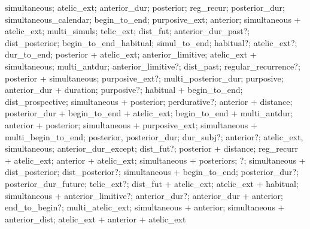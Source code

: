 simultaneous; atelic\_ext; anterior\_dur; posterior; reg\_recur; posterior\_dur; simultaneous\_calendar; begin\_to\_end; purposive\_ext; anterior; simultaneous + atelic\_ext; multi\_simuls; telic\_ext; dist\_fut; anterior\_dur\_past?; dist\_posterior; begin\_to\_end\_habitual; simul\_to\_end; habitual?; atelic\_ext?; dur\_to\_end; posterior + atelic\_ext; anterior\_limitive; atelic\_ext + simultaneous; multi\_antdur; anterior\_limitive?; dist\_past; regular\_recurrence?; posterior + simultaneous; purposive\_ext?; multi\_posterior\_dur; purposive; anterior\_dur + duration; purposive?; habitual + begin\_to\_end; dist\_prospective; simultaneous + posterior; perdurative?; anterior + distance; posterior\_dur + begin\_to\_end + atelic\_ext; begin\_to\_end + multi\_antdur; anterior + posterior; simultaneous + purposive\_ext; simultaneous + multi\_begin\_to\_end; posterior, posterior\_dur; dur\_subj?; anterior?; atelic\_ext, simultaneous; anterior\_dur\_except; dist\_fut?; posterior + distance; reg\_recurr + atelic\_ext; anterior + atelic\_ext; simultaneous + posteriors; ?; simultaneous + dist\_posterior; dist\_posterior?; simultaneous + begin\_to\_end; posterior\_dur?; posterior\_dur\_future; telic\_ext?; dist\_fut + atelic\_ext; atelic\_ext + habitual; simultaneous + anterior\_limitive?; anterior\_dur?; anterior\_dur + anterior; end\_to\_begin?; multi\_atelic\_ext; simultaneous + anterior; simultaneous + anterior\_dist; atelic\_ext + anterior + atelic\_ext%